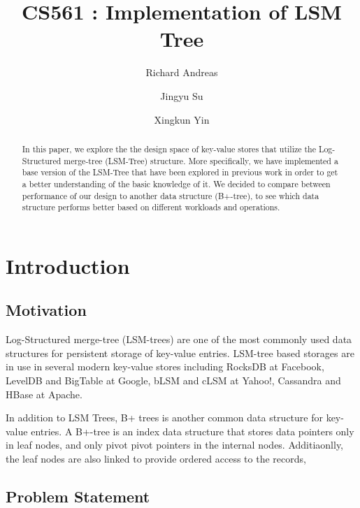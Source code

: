 \documentclass[sigconf]{acmart}
\begin{document}
\title{CS561 : Implementation of LSM Tree}

\author{Richard Andreas}
\author{Jingyu Su}
\author{Xingkun Yin}

\begin{abstract}
    In this paper, we explore the the design space of key-value stores that utilize the Log-Structured merge-tree (LSM-Tree) structure. More specifically, we have implemented a base version of the LSM-Tree that have been explored in previous work in order to get a better understanding of the basic knowledge of it. We decided to compare between performance of our design to another data structure (B+-tree), to see which data structure performs better based on different workloads and operations.
\end{abstract}

\maketitle

\section{Introduction}

\subsection{Motivation}

Log-Structured merge-tree (LSM-trees) are one of the most commonly used data structures for persistent storage of key-value entries. LSM-tree based storages are in use in several modern key-value stores including RocksDB at
Facebook, LevelDB and BigTable at Google, bLSM and cLSM at Yahoo!, Cassandra
and HBase at Apache. 

In addition to LSM Trees, B+ trees is another common data structure for key-value entries. A B+-tree is an index data structure that stores data pointers only in leaf nodes, and only pivot pivot pointers in the internal nodes. Additiaonlly, the leaf nodes are also linked to provide ordered access to the records,

\subsection{Problem Statement}
\end{document}
